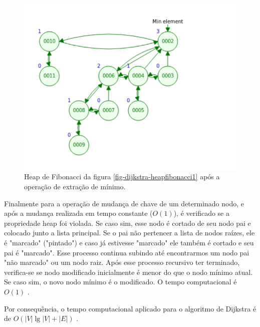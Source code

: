 \begin{figure}[H]
\centering
\includegraphics[width=.54\textwidth]{figuras/fibonacci-heap2} 
\caption{Heap de Fibonacci da figura \ref{fig-dijkstra-heapfibonacci1} após a operação de extração de mínimo.}
\label{fig-dijkstra-heapfibonacci2}
\end{figure}


Finalmente para a operação de mudança de chave de um determinado nodo, e após a mudança realizada em tempo constante ($O(1)$), é verificado se a propriedade heap foi violada. Se caso sim, esse nodo é cortado de seu nodo pai e colocado junto a lista principal. Se o pai não pertencer a lista de nodos raízes, ele é "marcado" ("pintado") e caso já estivesse "marcado" ele também é cortado e seu pai é "marcado". Esse processo continua subindo até encontrarmos um nodo pai "não marcado" ou um nodo raiz. Após esse processo recursivo ter terminado, verifica-se se nodo modificado inicialmente é menor do que o nodo mínimo atual. Se caso sim, o novo nodo mínimo é o modificado. O tempo computacional é $O(1)$ \cite{cormen2009introduction}.

Por consequência, o tempo computacional aplicado para o algoritmo de Dijkstra é de $O(|V|\lg |V| + |E|)$ \cite{cormen2009introduction}.